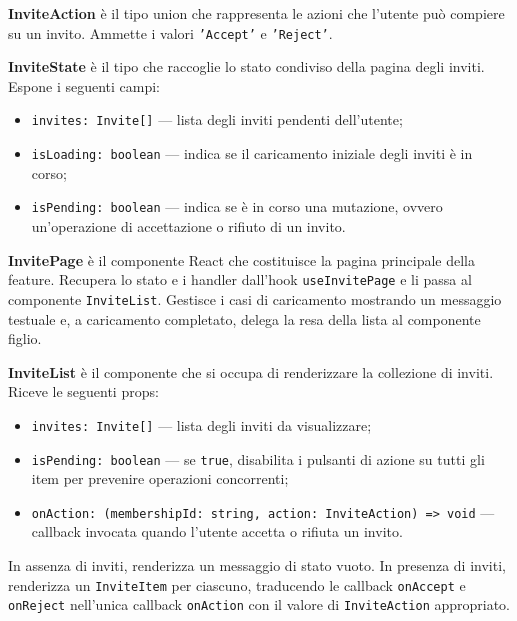 \documentclass[a4paper, 11pt]{article}
\newcounter{subsubsubsection}[subsubsection]
\newcounter{subsubsubsubsection}[subsubsubsection]
\begin{document}
\textbf{InviteAction} è il tipo union che rappresenta le azioni che l'utente può compiere su un
invito. Ammette i valori \texttt{'Accept'} e \texttt{'Reject'}.

\textbf{InviteState} è il tipo che raccoglie lo stato condiviso della pagina degli inviti. Espone
i seguenti campi:
\begin{itemize}
  \item \texttt{invites: Invite[]} — lista degli inviti pendenti dell'utente;
  \item \texttt{isLoading: boolean} — indica se il caricamento iniziale degli inviti è in corso;
  \item \texttt{isPending: boolean} — indica se è in corso una mutazione, ovvero un'operazione di
        accettazione o rifiuto di un invito.
\end{itemize}


\textbf{InvitePage} è il componente React che costituisce la pagina principale della feature.
Recupera lo stato e i handler dall'hook \texttt{useInvitePage} e li passa al componente
\texttt{InviteList}. Gestisce i casi di caricamento mostrando un messaggio testuale e, a
caricamento completato, delega la resa della lista al componente figlio.

\textbf{InviteList} è il componente che si occupa di renderizzare la collezione di inviti. Riceve
le seguenti props:
\begin{itemize}
  \item \texttt{invites: Invite[]} — lista degli inviti da visualizzare;
  \item \texttt{isPending: boolean} — se \texttt{true}, disabilita i pulsanti di azione su tutti
        gli item per prevenire operazioni concorrenti;
  \item \texttt{onAction: (membershipId: string, action: InviteAction) => void} — callback
        invocata quando l'utente accetta o rifiuta un invito.
\end{itemize}
In assenza di inviti, renderizza un messaggio di stato vuoto. In presenza di inviti, renderizza
un \texttt{InviteItem} per ciascuno, traducendo le callback \texttt{onAccept} e \texttt{onReject}
nell'unica callback \texttt{onAction} con il valore di \texttt{InviteAction} appropriato.
\end{document}
